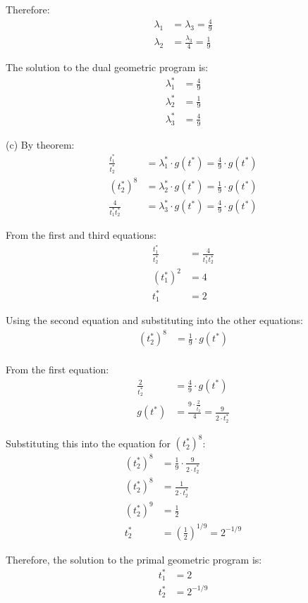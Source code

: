 \documentclass{article}
\begin{document}
Therefore:
\begin{align*}
\lambda_1 &= \lambda_3 = \frac{4}{9}\\
\lambda_2 &= \frac{\lambda_3}{4} = \frac{1}{9}
\end{align*}

The solution to the dual geometric program is:
\begin{align*}
\lambda_1^* &= \frac{4}{9}\\
\lambda_2^* &= \frac{1}{9}\\
\lambda_3^* &= \frac{4}{9}
\end{align*}

(c) By theorem:
\begin{align*}
\frac{t_1^*}{t_2^*} &= \lambda_1^* \cdot g(t^*) = \frac{4}{9} \cdot g(t^*)\\
(t_2^*)^8 &= \lambda_2^* \cdot g(t^*) = \frac{1}{9} \cdot g(t^*)\\
\frac{4}{t_1^* t_2^*} &= \lambda_3^* \cdot g(t^*) = \frac{4}{9} \cdot g(t^*)
\end{align*}

From the first and third equations:
\begin{align*}
\frac{t_1^*}{t_2^*} &= \frac{4}{t_1^* t_2^*}\\
(t_1^*)^2 &= 4\\
t_1^* &= 2
\end{align*}

Using the second equation and substituting into the other equations:
\begin{align*}
(t_2^*)^8 &= \frac{1}{9} \cdot g(t^*)\\
\end{align*}

From the first equation:
\begin{align*}
\frac{2}{t_2^*} &= \frac{4}{9} \cdot g(t^*)\\
g(t^*) &= \frac{9 \cdot \frac{2}{t_2^*}}{4} = \frac{9}{2 \cdot t_2^*}
\end{align*}

Substituting this into the equation for $(t_2^*)^8$:
\begin{align*}
(t_2^*)^8 &= \frac{1}{9} \cdot \frac{9}{2 \cdot t_2^*}\\
(t_2^*)^8 &= \frac{1}{2 \cdot t_2^*}\\
(t_2^*)^9 &= \frac{1}{2}\\
t_2^* &= \left(\frac{1}{2}\right)^{1/9} = 2^{-1/9}
\end{align*}

Therefore, the solution to the primal geometric program is:
\begin{align*}
t_1^* &= 2\\
t_2^* &= 2^{-1/9}
\end{align*}
\end{document}
